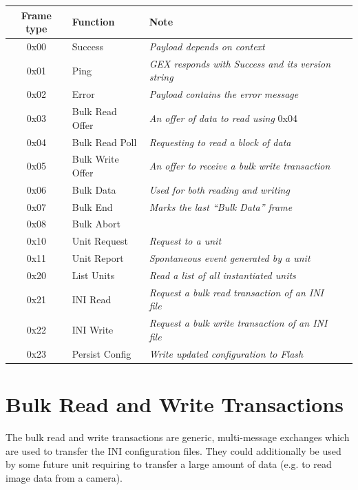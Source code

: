 \begin{table}[h]
	\centering
	\begin{tabular}{clll}
		\toprule
		\textbf{Frame type} & \textbf{Function} & \textbf{Note} \\
		\midrule
		0x00 & Success & \textit{Payload depends on context} \\
		0x01 & Ping & \textit{GEX responds with Success and its version string} \\
		0x02 & Error & \textit{Payload contains the error message} \\
		\midrule
		0x03 & Bulk Read Offer & \textit{An offer of data to read using }0x04 \\
		0x04 & Bulk Read Poll & \textit{Requesting to read a block of data} \\
		0x05 & Bulk Write Offer & \textit{An offer to receive a bulk write transaction} \\
		0x06 & Bulk Data & \textit{Used for both reading and writing} \\
		0x07 & Bulk End & \textit{Marks the last ``Bulk Data'' frame} \\
		0x08 & Bulk Abort & \textit{} \\
		\midrule
		0x10 & Unit Request & \textit{Request to a unit} \\
		0x11 & Unit Report & \textit{Spontaneous event generated by a unit} \\
		\midrule
		0x20 & List Units & \textit{Read a list of all instantiated units} \\
		0x21 & INI Read & \textit{Request a bulk read transaction of an INI file} \\
		0x22 & INI Write & \textit{Request a bulk write transaction of an INI file} \\
		0x23 & Persist Config & \textit{Write updated configuration to Flash} \\
		\bottomrule
	\end{tabular}
\end{table}


\section{Bulk Read and Write Transactions} \label{sec:tf-bulk-rw}

The bulk read and write transactions are generic, multi-message exchanges which are used to transfer the INI configuration files. They could additionally be used by some future unit requiring to transfer a large amount of data (e.g. to read image data from a camera).


